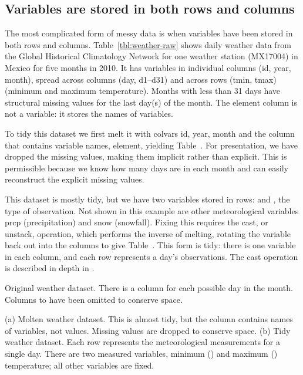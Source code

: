 \documentclass[article]{jss}
\begin{document}
\subsection{Variables are stored in both rows and columns}

The most complicated form of messy data is when variables have been stored in both rows and columns. Table~\ref{tbl:weather-raw} shows daily weather data from the Global Historical Climatology Network for one weather station (MX17004) in Mexico for five months in 2010. It has variables in individual columns (id, year, month), spread across columns (day, d1--d31) and across rows (tmin, tmax) (minimum and maximum temperature). Months with less than 31 days have structural missing values for the last day(s) of the month. The element column is not a variable: it stores the names of variables.

To tidy this dataset we first melt it with colvars id, year, month and the column that contains variable names, element, yielding Table~. For presentation, we have dropped the missing values, making them implicit rather than explicit. This is permissible because we know how many days are in each month and can easily reconstruct the explicit missing values.

This dataset is mostly tidy, but we have two variables stored in rows:  and , the type of observation. Not shown in this example are other meteorological variables prcp (precipitation) and snow (snowfall). Fixing this requires the cast, or unstack, operation, which performs the inverse of melting, rotating the  variable back out into the columns to give Table~. This form is tidy: there is one variable in each column, and each row represents a day's observations. The cast operation is described in depth in \citet{wickham:2007b}.

\begin{table}[htbp]
  \centering
  
  \caption{Original weather dataset.  There is a column for each possible day in the month.  Columns  to  have been omitted to conserve space.}
  \label{tbl:weather-raw}
\end{table}

\begin{table}[htbp]
  \centering
  \hspace{2em}%

  \caption{(a) Molten weather dataset.  This is almost tidy, but the  column contains names of variables, not values. Missing values are dropped to conserve space. (b) Tidy weather dataset. Each row represents the meteorological measurements for a single day.  There are two measured variables, minimum () and maximum () temperature; all other variables are fixed.}
  \label{tbl:weather-clean}
\end{table}
\end{document}
